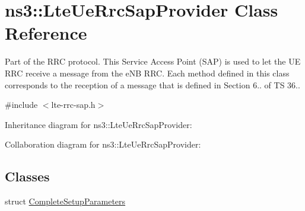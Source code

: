 \hypertarget{classns3_1_1LteUeRrcSapProvider}{}\section{ns3\+:\+:Lte\+Ue\+Rrc\+Sap\+Provider Class Reference}
\label{classns3_1_1LteUeRrcSapProvider}


Part of the R\+RC protocol. This Service Access Point (S\+AP) is used to let the UE R\+RC receive a message from the e\+NB R\+RC. Each method defined in this class corresponds to the reception of a message that is defined in Section 6.. of TS 36..  




{\ttfamily \#include $<$lte-\/rrc-\/sap.\+h$>$}



Inheritance diagram for ns3\+:\+:Lte\+Ue\+Rrc\+Sap\+Provider\+:


Collaboration diagram for ns3\+:\+:Lte\+Ue\+Rrc\+Sap\+Provider\+:
\subsection*{Classes}
\begin{DoxyCompactItemize}
\item 
struct \hyperlink{structns3_1_1LteUeRrcSapProvider_1_1CompleteSetupParameters}{Complete\+Setup\+Parameters}
\end{DoxyCompactItemize}
